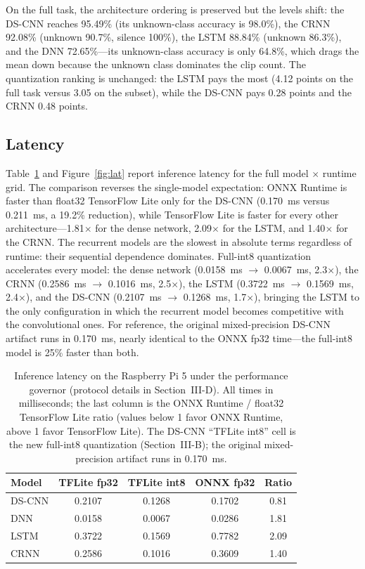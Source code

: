 \documentclass[conference,a4paper]{IEEEtran}
\begin{document}
On the full task, the architecture ordering is preserved but the levels shift: the DS-CNN reaches 95.49\% (its unknown-class accuracy is 98.0\%), the CRNN 92.08\% (unknown 90.7\%, silence 100\%), the LSTM 88.84\% (unknown 86.3\%), and the DNN 72.65\%---its unknown-class accuracy is only 64.8\%, which drags the mean down because the unknown class dominates the clip count. The quantization ranking is unchanged: the LSTM pays the most (4.12 points on the full task versus 3.05 on the subset), while the DS-CNN pays 0.28 points and the CRNN 0.48 points.

\subsection{Latency}

Table~\ref{tab:lat} and Figure~\ref{fig:lat} report inference latency for the full model $\times$ runtime grid. The comparison reverses the single-model expectation: ONNX Runtime is faster than float32 TensorFlow Lite only for the DS-CNN (0.170~ms versus 0.211~ms, a 19.2\% reduction), while TensorFlow Lite is faster for every other architecture---1.81$\times$ for the dense network, 2.09$\times$ for the LSTM, and 1.40$\times$ for the CRNN. The recurrent models are the slowest in absolute terms regardless of runtime: their sequential dependence dominates. Full-int8 quantization accelerates every model: the dense network (0.0158~ms $\rightarrow$ 0.0067~ms, 2.3$\times$), the CRNN (0.2586~ms $\rightarrow$ 0.1016~ms, 2.5$\times$), the LSTM (0.3722~ms $\rightarrow$ 0.1569~ms, 2.4$\times$), and the DS-CNN (0.2107~ms $\rightarrow$ 0.1268~ms, 1.7$\times$), bringing the LSTM to the only configuration in which the recurrent model becomes competitive with the convolutional ones. For reference, the original mixed-precision DS-CNN artifact runs in 0.170~ms, nearly identical to the ONNX fp32 time---the full-int8 model is 25\% faster than both.

\begin{table}[t]
\caption{Inference latency on the Raspberry Pi 5 under the performance governor (protocol details in Section~III-D). All times in milliseconds; the last column is the ONNX Runtime / float32 TensorFlow Lite ratio (values below 1 favor ONNX Runtime, above 1 favor TensorFlow Lite). The DS-CNN ``TFLite int8'' cell is the new full-int8 quantization (Section~III-B); the original mixed-precision artifact runs in 0.170~ms.}
\label{tab:lat}
\centering
{\footnotesize
\setlength{\tabcolsep}{4pt}
\begin{tabular}{lcccc}
\toprule
Model & TFLite fp32 & TFLite int8 & ONNX fp32 & Ratio \\
\midrule
DS-CNN & 0.2107 & 0.1268 & 0.1702 & 0.81 \\
DNN & 0.0158 & 0.0067 & 0.0286 & 1.81 \\
LSTM & 0.3722 & 0.1569 & 0.7782 & 2.09 \\
CRNN & 0.2586 & 0.1016 & 0.3609 & 1.40 \\
\bottomrule
\end{tabular}
}
\end{table}
\end{document}
